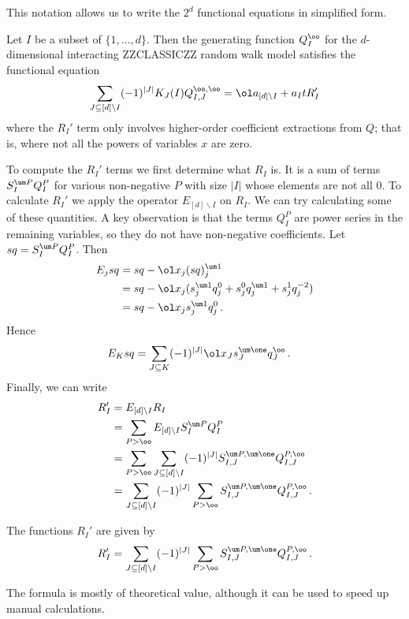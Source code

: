  This notation allows us to write the $2^d$ functional equations in simplified form.
\begin{corollary} Let $I$ be a subset of $\{1,\ldots,d\}$. Then the generating function $Q_I^{\oo}$ for the $d$-dimensional interacting ZZCLASSICZZ random walk model satisfies the functional equation
\begin{align}
	\sum_{J \subseteq [d]\backslash I}  (-1)^{|J|}K_J (I) Q_{I,J}^{\oo,\oo} = \ol a_{[d]\backslash I}+a_I t  R_I'
\end{align}
where the $R_I'$ term only involves higher-order coefficient extractions from $Q$; that is, where not all the powers of variables $x$ are zero.
\end{corollary}
To compute the $R_I'$ terms we first determine what $R_I$ is. It is a sum of terms $S_I^{\um P} Q_I^{P}$ for various non-negative $P$ with size $|I|$ whose elements are not all 0. To calculate $R_I'$ we apply the operator $E_{[d]\backslash I}$ on $R_I$. We can try calculating some of these quantities. A key observation is that the terms $Q_I^P$ are power series in the remaining variables, so they do not have non-negative coefficients. Let $sq = S_I^{\um P} Q_I^{P}$. Then
\begin{align}\begin{split}
	E_j sq &= sq - \ol x_j(sq)_j^{\um 1} \\ 
	&= sq - \ol x_j(s_j^{\um 1}q_j^0+s_j^{0}q_j^{\um 1}+s_j^{1}q_j^{-2})\\
	& = sq - \ol x_js_j^{\um 1}q_j^0\,.
\end{split}\end{align}
Hence
\begin{align}
	E_{K} sq &= \sum_{J\subseteq K} (-1)^{|J|}\ol x_J s_J^{\um \one} q_J^\oo\,.
\end{align}
Finally, we can write
\begin{align}\begin{split}
	R_I' &= E_{[d]\backslash I} R_I \\
	& = \sum_{P > \oo} E_{[d]\backslash I}S_I^{\um P}Q_I^P\\
	& = \sum_{P > \oo} \sum_{J \subseteq [d]\backslash I} (-1)^{|J|} S_{I,J}^{\um P,\um \one}Q_{I,J}^{P,\oo}\\
	& = \sum_{J \subseteq [d]\backslash I}(-1)^{|J|}\sum_{P > \oo} S_{I,J}^{\um P,\um \one}Q_{I,J}^{P,\oo}\,.
\end{split}\end{align}
\begin{prop} The functions $R_I'$ are given by
\begin{align}
	R_I' =  \sum_{J \subseteq [d]\backslash I}(-1)^{|J|}\sum_{P > \oo} S_{I,J}^{\um P,\um \one}Q_{I,J}^{P,\oo}\,.
\end{align}
\end{prop}
The formula is mostly of theoretical value, although it can be used to speed up manual calculations.
